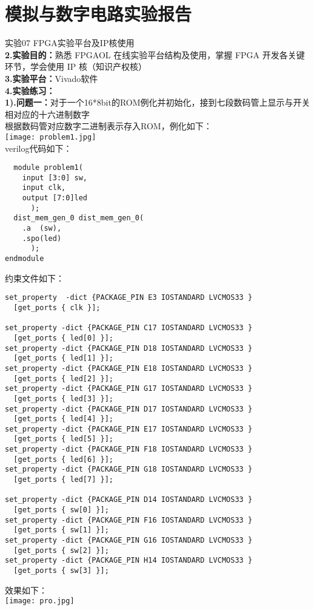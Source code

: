 \documentclass[12pt]{ctexart}
\begin{document}
\section*{模拟与数字电路实验报告}
实验07 FPGA实验平台及IP核使用 \\
{\bf2.实验目的：}熟悉 FPGAOL 在线实验平台结构及使用，掌握 FPGA 开发各关键环节，学会使用 IP 核（知识产权核）\\
{\bf3.实验平台：}Vivado软件\\
{\bf4.实验练习：}\\
{\bf1).问题一：}对于一个16*8bit的ROM例化并初始化，接到七段数码管上显示与开关相对应的十六进制数字\\
根据数码管对应数字二进制表示存入ROM，例化如下：\\
\texttt{[image: problem1.jpg]}\\
verilog代码如下：
\begin{lstlisting}
  module problem1(
    input [3:0] sw,
    input clk,
    output [7:0]led
      );
  dist_mem_gen_0 dist_mem_gen_0(
    .a  (sw),
    .spo(led)
      );
endmodule
\end{lstlisting}
约束文件如下：
\begin{lstlisting}
set_property  -dict {PACKAGE_PIN E3 IOSTANDARD LVCMOS33 } 
  [get_ports { clk }]; 

set_property -dict {PACKAGE_PIN C17 IOSTANDARD LVCMOS33 } 
  [get_ports { led[0] }];
set_property -dict {PACKAGE_PIN D18 IOSTANDARD LVCMOS33 } 
  [get_ports { led[1] }];
set_property -dict {PACKAGE_PIN E18 IOSTANDARD LVCMOS33 } 
  [get_ports { led[2] }];
set_property -dict {PACKAGE_PIN G17 IOSTANDARD LVCMOS33 } 
  [get_ports { led[3] }];
set_property -dict {PACKAGE_PIN D17 IOSTANDARD LVCMOS33 } 
  [get_ports { led[4] }];
set_property -dict {PACKAGE_PIN E17 IOSTANDARD LVCMOS33 } 
  [get_ports { led[5] }];
set_property -dict {PACKAGE_PIN F18 IOSTANDARD LVCMOS33 } 
  [get_ports { led[6] }];
set_property -dict {PACKAGE_PIN G18 IOSTANDARD LVCMOS33 } 
  [get_ports { led[7] }];

set_property -dict {PACKAGE_PIN D14 IOSTANDARD LVCMOS33 } 
  [get_ports { sw[0] }];
set_property -dict {PACKAGE_PIN F16 IOSTANDARD LVCMOS33 } 
  [get_ports { sw[1] }];
set_property -dict {PACKAGE_PIN G16 IOSTANDARD LVCMOS33 } 
  [get_ports { sw[2] }];
set_property -dict {PACKAGE_PIN H14 IOSTANDARD LVCMOS33 } 
  [get_ports { sw[3] }];
\end{lstlisting}
效果如下：\\
\texttt{[image: pro.jpg]}\\
\end{document}
